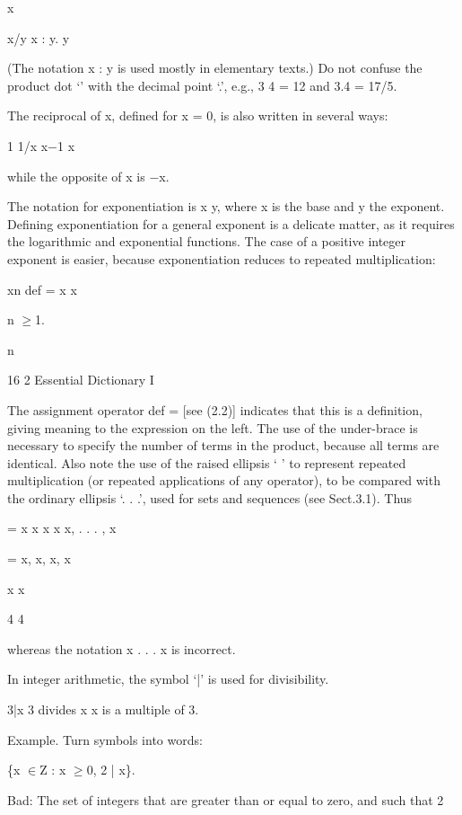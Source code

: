 \documentclass[11pt]{article}
\theoremstyle{plain}
\theoremstyle{definition}
\begin{document}
x

x/y x : y. y

(The notation x : y is used mostly in elementary texts.) Do not confuse the product dot `\textperiodcentered{}' with the decimal point `.', e.g., 3 \textperiodcentered{} 4 = 12 and 3.4 = 17/5.

The reciprocal of x, defined for x = 0, is also written in several ways:

1 1/x x$-$1 x

while the opposite of x is $-$x.

The notation for exponentiation is x y, where x is the base and y the exponent. Defining exponentiation for a general exponent is a delicate matter, as it requires the logarithmic and exponential functions. The case of a positive integer exponent is easier, because exponentiation reduces to repeated multiplication:

xn def = x \textperiodcentered{} \textperiodcentered{} \textperiodcentered{} x

n $\geq$1.

n

16 2 Essential Dictionary I

The assignment operator def = [see (2.2)] indicates that this is a definition, giving meaning to the expression on the left. The use of the under-brace is necessary to specify the number of terms in the product, because all terms are identical. Also note the use of the raised ellipsis `\textperiodcentered{} \textperiodcentered{} \textperiodcentered{} ' to represent repeated multiplication (or repeated applications of any operator), to be compared with the ordinary ellipsis `. . .', used for sets and sequences (see Sect.3.1). Thus

= x \textperiodcentered{} x \textperiodcentered{} x \textperiodcentered{} x x, . . . , x

= x, x, x, x

x \textperiodcentered{} \textperiodcentered{} \textperiodcentered{} x

4 4

whereas the notation x . . . x is incorrect.

In integer arithmetic, the symbol `|' is used for divisibility.

3|x 3 divides x x is a multiple of 3.

Example. Turn symbols into words:

\{x $\in$Z : x $\geq$0, 2 | x\}.

Bad: The set of integers that are greater than or equal to zero, and such that 2
\end{document}

